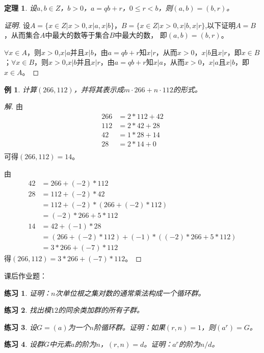 \documentclass{article}
\newtheorem{Thm}{定理}
\newtheorem{Exercise}{练习}
\newtheorem*{Example}{例}
\begin{document}
\begin{CJK*}{UTF8}{gbsn}
\begin{Thm}
  设$a,b\in Z$，$b>0$，$a=qb+r$，$0\leq r < b$，则$(a,b)=(b,r)$。
\end{Thm}
\begin{proof}[证明]
  设$A=\{x\in Z|x>0,x|a,x|b\}$，$B=\{x\in Z|x>0,x|b,x|r\}$,以下证明$A=B$，从而集合$A$中最大的数等于集合$B$中最大的数，
  即$(a,b)=(b,r)$。

  $\forall x\in A$，则$x>0$,$x|a$并且$x|b$，由$a=qb+r$知$x|r$，从而$x>0$，$x|b$且$x|r$，即$x\in B$；$\forall x\in B$，则$x>0$,$x|b$并且$x|r$，由$a=qb+r$知$x|a$，从而$x>0$，$x|a$且$x|b$，即$x\in A$。
\end{proof}
\begin{Example}
  计算$(266,112)$，并将其表示成$m\cdot 266 + n\cdot 112$的形式。
\end{Example}
\begin{proof}[解]
  由
  \begin{align*}
    266&=2*112+42\\
    112&=2*42+28\\
    42&=1*28+14\\
    28&=2*14+0\\
  \end{align*}
可得$(266,112)=14$。

由
\begin{align*}
  42&=266+(-2)*112\\
  28&=112+(-2)*42\\
  &=112+(-2)*(266+(-2)*112)\\
  &=(-2)*266+5*112\\
  14&=42+(-1)*28\\
  &=(266+(-2)*112)+(-1)*((-2)*266+5*112)\\
  &=3*266+(-7)*112
\end{align*}
得$(266,112)=3*266+(-7)*112$。
\end{proof}
课后作业题：
\begin{Exercise}
证明：$n$次单位根之集对数的通常乘法构成一个循环群。
\end{Exercise}

\begin{Exercise}
找出模$12$的同余类加群的所有子群。
\end{Exercise}

\begin{Exercise}
  设$G=(a)$为一个$n$阶循环群。证明：如果$(r,n)=1$，则$(a^r)=G$。
\end{Exercise}


\begin{Exercise}
  设群$G$中元素$a$的阶为$n$，$(r,n)=d$。证明：$a^r$的阶为$n/d$。
\end{Exercise}
\end{CJK*}
\end{document}
